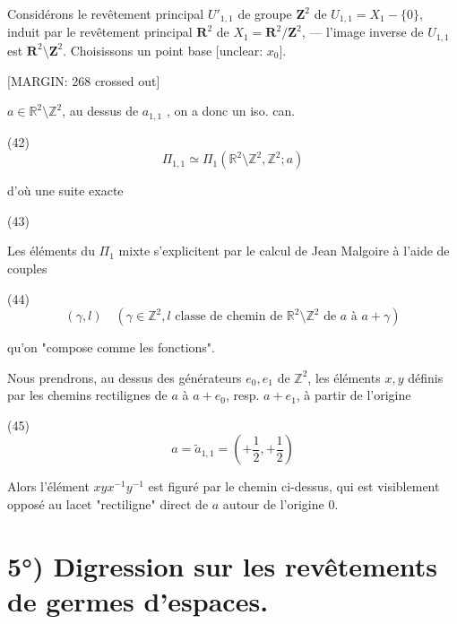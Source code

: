 Considérons le revêtement principal $U'_{1,1}$ de groupe $\mathbf{Z}^2$ de $U_{1,1} = X_1 - \{0\}$, induit par le revêtement principal $\mathbf{R}^2$ de $X_1 = \mathbf{R}^2/\mathbf{Z}^2$, — l'image inverse de $U_{1,1}$ est $\mathbf{R}^2 \setminus \mathbf{Z}^2$. Choisissons un point base [unclear: $x_0$].

\newpage


[MARGIN: 268 crossed out]

$a \in \mathbb{R}^2 \setminus \mathbb{Z}^2$,
au dessus de $a_{1,1}$ , on a donc un iso. can.

(42) $$ \Pi_{1,1} \simeq \Pi_1(\mathbb{R}^2 \setminus \mathbb{Z}^2, \mathbb{Z}^2; a) $$

d'où une suite exacte

(43)

Les éléments du $\Pi_1$ mixte s'explicitent par le calcul de Jean Malgoire à l'aide de couples

(44) $$ (\gamma, l) \quad (\gamma \in \mathbb{Z}^2, l \text{ classe de chemin de } \mathbb{R}^2 \setminus \mathbb{Z}^2 \text{ de } a \text{ à } a+\gamma) $$

qu'on "compose comme les fonctions".

Nous prendrons, au dessus des générateurs $e_0, e_1$ de $\mathbb{Z}^2$, les éléments $x, y$ définis par les chemins rectilignes de $a$ à $a+e_0$, resp. $a+e_1$, à partir de l'origine

(45) $$ a = \tilde{a}_{1,1} = (+\frac{1}{2}, +\frac{1}{2}) $$

Alors l'élément $xyx^{-1}y^{-1}$ est figuré par le chemin ci-dessus, qui est visiblement opposé au lacet "rectiligne" direct de $a$ autour de l'origine $0$.

\newpage


\section*{5°) Digression sur les revêtements de germes d'espaces.}

